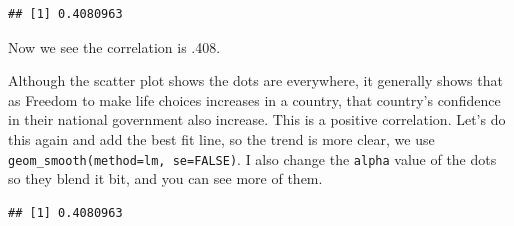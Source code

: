 \documentclass[
]{book}
\newenvironment{Shaded}{\begin{snugshade}}{\end{snugshade}}
\newcommand{\AttributeTok}[1]{\textcolor[rgb]{0.13,0.29,0.53}{#1}}
\newcommand{\CommentTok}[1]{\textcolor[rgb]{0.56,0.35,0.01}{\textit{#1}}}
\newcommand{\FunctionTok}[1]{\textcolor[rgb]{0.13,0.29,0.53}{\textbf{#1}}}
\newcommand{\NormalTok}[1]{#1}
\newcommand{\OtherTok}[1]{\textcolor[rgb]{0.56,0.35,0.01}{#1}}
\newcommand{\SpecialCharTok}[1]{\textcolor[rgb]{0.81,0.36,0.00}{\textbf{#1}}}
\newcommand{\StringTok}[1]{\textcolor[rgb]{0.31,0.60,0.02}{#1}}
\begin{document}
\begin{verbatim}
## [1] 0.4080963
\end{verbatim}

Now we see the correlation is .408.

Although the scatter plot shows the dots are everywhere, it generally shows that as Freedom to make life choices increases in a country, that country's confidence in their national government also increase. This is a positive correlation. Let's do this again and add the best fit line, so the trend is more clear, we use \texttt{geom\_smooth(method=lm,\ se=FALSE)}. I also change the \texttt{alpha} value of the dots so they blend it bit, and you can see more of them.

\begin{Shaded}
\end{Shaded}

\begin{verbatim}
## [1] 0.4080963
\end{verbatim}
\end{document}
